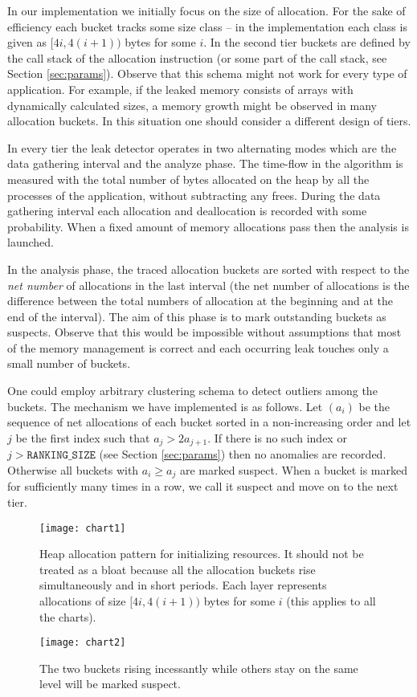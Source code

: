 \documentclass[preprint, numbers]{sigplanconf}
\begin{document}
In our implementation we initially focus on the size of allocation.
For the sake of efficiency each bucket tracks some size class --
in the implementation each class is given as $[4i, 4(i+1))$ bytes for some $i$.
In the second tier buckets are defined by the call stack of the allocation instruction
(or some part of the call stack, see Section \ref{sec:params}).
Observe that this schema might not work for every type of application.
For example, if the leaked memory consists of arrays with dynamically calculated sizes,
a memory growth might be observed in many allocation buckets.
In this situation one should consider a different design of tiers.

In every tier the leak detector operates in two alternating modes which are
the data gathering interval and the analyze phase.
The time-flow in the algorithm is measured with the total number of bytes allocated on the heap
by all the processes of the application, without subtracting any frees.
During the data gathering interval each allocation and deallocation is recorded with some
probability.
When a fixed amount of memory allocations pass then the analysis is launched.

In the analysis phase, the traced allocation buckets are sorted with respect to the \textit{net number} of allocations
in the last interval
(the net number of allocations is the difference between the total numbers of allocation at
the beginning and at the end of the interval).
The aim of this phase is to mark outstanding buckets as suspects.
Observe that this would be impossible without assumptions that
most of the memory management is correct and each occurring leak
touches only a small number of buckets.

One could employ arbitrary clustering schema to detect outliers among the buckets.
The mechanism we have implemented is as follows.
Let $(a_i)$ be the sequence of net allocations of each bucket sorted in a non-increasing order
and let $j$ be the first index such that $a_j > 2a_{j+1}$.
If there is no such index or $j > \texttt{RANKING\_SIZE}$ (see Section \ref{sec:params}) then no anomalies are recorded.
Otherwise all buckets with $a_i \ge a_j$ are marked suspect.
When a bucket is marked for sufficiently many times in a row,
we call it suspect and move on to the next tier.

\begin{figure}
\centering
\texttt{[image: chart1]}
\caption{Heap allocation pattern for initializing resources.
	It should not be treated as a bloat because all the allocation buckets rise
	simultaneously and in short periods.
	Each layer represents allocations of size $[4i, 4(i+1))$ bytes for some $i$
	(this applies to all the charts).}
\label{fig:chart1}
\vspace{0.5cm}

\texttt{[image: chart2]}
\caption{The two buckets rising incessantly while others stay on the same level will
	be marked suspect.}
\label{fig:chart2}
\end{figure}
\end{document}

